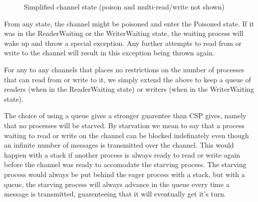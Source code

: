\documentclass[a4paper,12pt]{article}
\begin{document}
\begin{figure}[h]
\centering
\caption{Simplified channel state (poison and multi-read/write not shown)}
\label{channel-state}
\end{figure}

From any state, the channel might be poisoned and enter the Poisoned state. If it was in the
ReaderWaiting or the WriterWaiting state, the waiting process will wake up and throw a special
exception. Any further attempts to read from or write to the channel will result in this 
exception being thrown again.

For any to any channels that places no restrictions on the number of processes that can read
from or write to it, we simply extend the above to keep a queue of readers (when in the 
ReaderWaiting state) or writers (when in the WriterWaiting state).

The choice of using a queue gives a stronger guarentee than CSP gives, namely that no processes
will be starved. By starvation we mean to say that a process waiting to read or write on the
channel can be blocked indefinately even though an infinite number of messages is transmitted
over the channel. This would happen with a stack if another process is always ready to read or 
write again before the channel was ready to accomodate the starving process. The starving process
would always be put behind the eager process with a stack, but with a queue, the starving process
will always advance in the queue every time a message is transmitted, guarenteeing that it will
eventually get it's turn.
\end{document}

